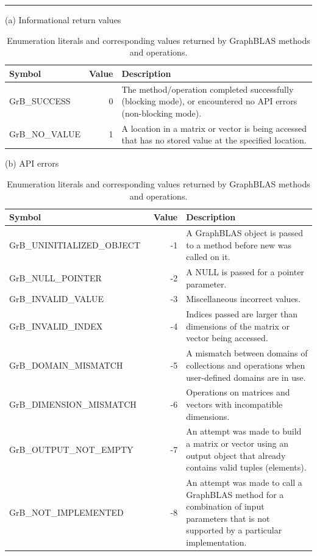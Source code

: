 \begin{table}[bh]
\hrule
\begin{center}
\caption{Enumeration literals and corresponding values returned by GraphBLAS methods and operations.}
\label{Tab:GrBInfoValues}

\vspace{1\baselineskip}
(a) Informational return values
\vspace{1\baselineskip}

\begin{tabular}{l|r|p{4.45in}}
Symbol    & Value & Description \\ \hline
{\sf GrB\_SUCCESS}     &  0 & The method/operation completed successfully (blocking mode), or encountered no API errors (non-blocking mode). \\
{\sf GrB\_NO\_VALUE}   &  1 & A location in a matrix or vector is being accessed that has no stored value at the specified location.\\
\end{tabular}

\vspace{1\baselineskip}
(b) API errors
\vspace{1\baselineskip}

\begin{tabular}{l|r|p{3.45in}}
Symbol    & Value & Description \\ \hline
{\sf GrB\_UNINITIALIZED\_OBJECT} & -1 & A GraphBLAS object is passed to a method before {\sf new} was called on it.\\
{\sf GrB\_NULL\_POINTER}         & -2 & A NULL is passed for a pointer parameter. \\
{\sf GrB\_INVALID\_VALUE}        & -3 & Miscellaneous incorrect values. \\
{\sf GrB\_INVALID\_INDEX}        & -4 & Indices passed are larger than dimensions of the matrix or vector being accessed. \\
{\sf GrB\_DOMAIN\_MISMATCH}      & -5 & A mismatch between domains of collections and operations when user-defined domains are in use.\\
{\sf GrB\_DIMENSION\_MISMATCH}~~ & -6 & Operations on matrices and vectors with incompatible dimensions. \\
{\sf GrB\_OUTPUT\_NOT\_EMPTY}    & -7 & An attempt was made to build a matrix or vector using an output object that already contains valid tuples (elements).\\
{\sf GrB\_NOT\_IMPLEMENTED}      & -8 &  An attempt was made to call a GraphBLAS method for a combination of input parameters that is not supported by a particular implementation.\\
\end{tabular}


\end{center}
\end{table}

